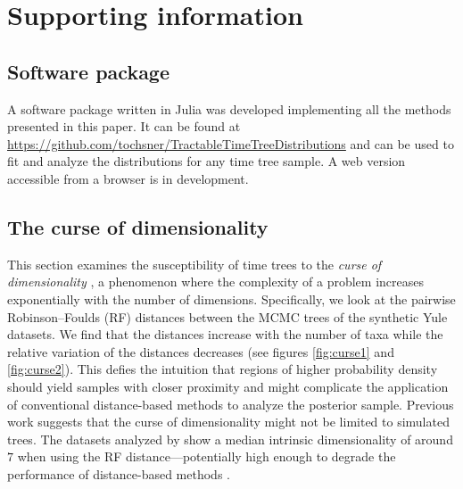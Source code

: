 \documentclass[10pt,letterpaper]{article}
\begin{document}
\section*{Supporting information}

\subsection*{Software package}

A software package written in Julia \cite{juliapackage} was developed implementing all the methods presented in this paper. It can be found at \url{https://github.com/tochsner/TractableTimeTreeDistributions} and can be used to fit and analyze the distributions for any time tree sample. A web version accessible from a browser is in development.

\subsection*{The curse of dimensionality}

This section examines the susceptibility of time trees to the \emph{curse of dimensionality} \cite{curse,curse2}, a phenomenon where the complexity of a problem increases exponentially with the number of dimensions. Specifically, we look at the pairwise Robinson–Foulds (RF) distances between the MCMC trees of the synthetic Yule datasets. We find that the distances increase with the number of taxa while the relative variation of the distances decreases (see figures \ref{fig:curse1} and \ref{fig:curse2}). This defies the intuition that regions of higher probability density should yield samples with closer proximity and might complicate the application of conventional distance-based methods to analyze the posterior sample. Previous work suggests that the curse of dimensionality might not be limited to simulated trees. The datasets analyzed by \cite{dimensionality} show a median intrinsic dimensionality of around $7$ when using the RF distance---potentially high enough to degrade the performance of distance-based methods \cite{curseimplications}.
\end{document}
